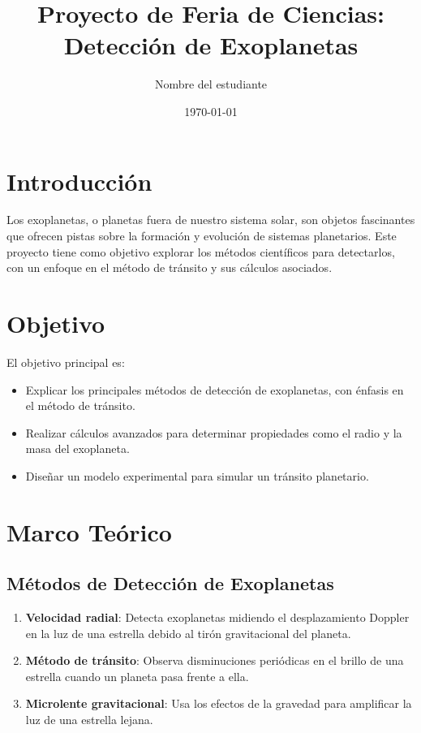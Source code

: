 \documentclass[12pt]{article}
\title{\textbf{Proyecto de Feria de Ciencias: Detección de Exoplanetas}}
\author{Nombre del estudiante}
\date{\today}
\begin{document}
\maketitle

\tableofcontents

\newpage

\section{Introducción}
Los exoplanetas, o planetas fuera de nuestro sistema solar, son objetos fascinantes que ofrecen pistas sobre la formación y evolución de sistemas planetarios. Este proyecto tiene como objetivo explorar los métodos científicos para detectarlos, con un enfoque en el método de tránsito y sus cálculos asociados.

\section{Objetivo}
El objetivo principal es:
\begin{itemize}
    \item Explicar los principales métodos de detección de exoplanetas, con énfasis en el método de tránsito.
    \item Realizar cálculos avanzados para determinar propiedades como el radio y la masa del exoplaneta.
    \item Diseñar un modelo experimental para simular un tránsito planetario.
\end{itemize}

\section{Marco Teórico}
\subsection{Métodos de Detección de Exoplanetas}
\begin{enumerate}
    \item \textbf{Velocidad radial}: Detecta exoplanetas midiendo el desplazamiento Doppler en la luz de una estrella debido al tirón gravitacional del planeta.
    \item \textbf{Método de tránsito}: Observa disminuciones periódicas en el brillo de una estrella cuando un planeta pasa frente a ella.
    \item \textbf{Microlente gravitacional}: Usa los efectos de la gravedad para amplificar la luz de una estrella lejana.
\end{enumerate}
\end{document}
